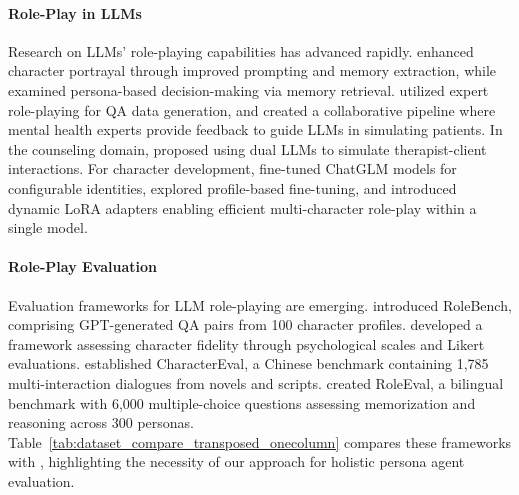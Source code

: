 \paragraph{Role-Play in LLMs}
Research on LLMs' role-playing capabilities has advanced rapidly. \citet{li2023chatharuhi} enhanced character portrayal through improved prompting and memory extraction, while \citet{xu2024character} examined persona-based decision-making via memory retrieval. \citet{xu2023expertprompting} utilized expert role-playing for QA data generation, and \citet{louie2024roleplay} created a collaborative pipeline where mental health experts provide feedback to guide LLMs in simulating patients. In the counseling domain, \citet{interactive} proposed using dual LLMs to simulate therapist-client interactions. For character development, \citet{characterglm} fine-tuned ChatGLM models for configurable identities, \citet{characterllm} explored profile-based fine-tuning, and \citet{neeko} introduced dynamic LoRA adapters enabling efficient multi-character role-play within a single model.
\vspace{-7.5pt}
\paragraph{Role-Play Evaluation}
Evaluation frameworks for LLM role-playing are emerging. \citet{wang2023rolellm} introduced RoleBench, comprising GPT-generated QA pairs from 100 character profiles. \citet{wang2024incharacter} developed a framework assessing character fidelity through psychological scales and Likert evaluations. \citet{tu2024charactereval} established CharacterEval, a Chinese benchmark containing 1,785 multi-interaction dialogues from novels and scripts. \citet{shen2023roleeval} created RoleEval, a bilingual benchmark with 6,000 multiple-choice questions assessing memorization and reasoning across 300 personas. Table~\ref{tab:dataset_compare_transposed_onecolumn} compares these frameworks with \benchmark, highlighting the necessity of our approach for holistic persona agent evaluation.